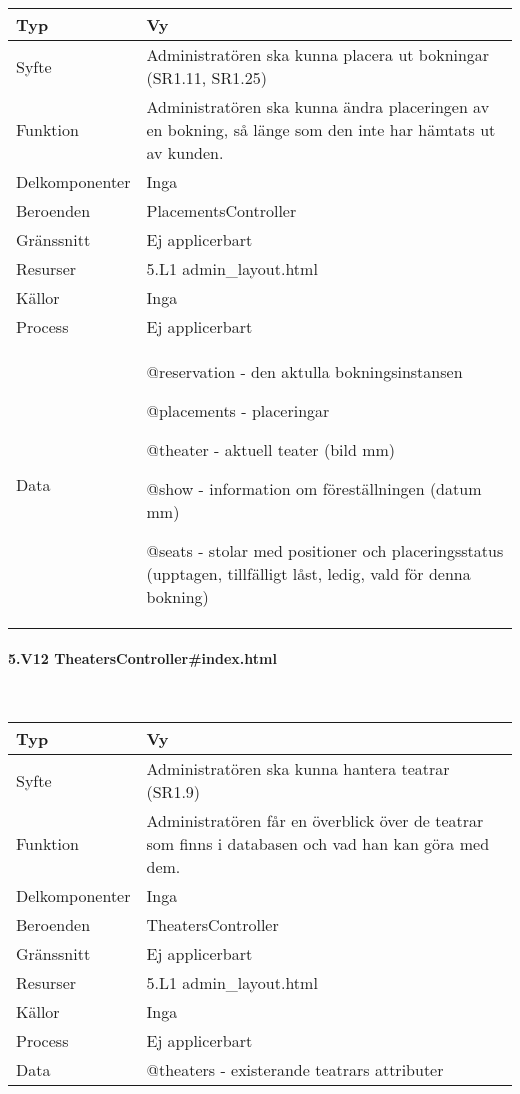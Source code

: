 \documentclass[a4paper, twoside, 11pt, titlepage]{article}
\begin{document}
			\begin {table} [ht] \begin{tabular} {  p{3.5cm} p{9.6cm} }
				\hline
				{Typ} & {Vy} \\
				\hline
				{Syfte} & {Administratören ska kunna placera ut bokningar (SR1.11, SR1.25)} \\
				\hline
				{Funktion} & {Administratören ska kunna ändra placeringen av en bokning, så länge som den inte har hämtats ut av kunden.} \\
				\hline
				{Delkomponenter} & {Inga} \\
				\hline
				{Beroenden} & {PlacementsController} \\
				\hline
				{Gränssnitt} & {Ej applicerbart} \\
				\hline
				{Resurser} & {5.L1 admin\_layout.html} \\
				\hline
				{Källor} & {Inga} \\
				\hline
				{Process} & {Ej applicerbart} \\
				\hline
				{Data} & {@reservation - den aktulla bokningsinstansen

@placements - placeringar

@theater - aktuell teater (bild mm)

@show - information om föreställningen (datum mm)

@seats - stolar med positioner och placeringsstatus (upptagen, tillfälligt låst, ledig, vald för denna bokning)} \\
				\hline
			\end{tabular} \end{table} \FloatBarrier


			\paragraph{5.V12 TheatersController\#index.html}\

			\begin {table} [ht] \begin{tabular} {  p{3.5cm} p{9.6cm} }
				\hline
				{Typ} & {Vy} \\
				\hline
				{Syfte} & {Administratören ska kunna hantera teatrar (SR1.9)} \\
				\hline
				{Funktion} & {Administratören får en överblick över de teatrar som finns i databasen och vad han kan göra med dem.} \\
				\hline
				{Delkomponenter} & {Inga} \\
				\hline
				{Beroenden} & {TheatersController} \\
				\hline
				{Gränssnitt} & {Ej applicerbart} \\
				\hline
				{Resurser} & {5.L1 admin\_layout.html} \\
				\hline
				{Källor} & {Inga} \\
				\hline
				{Process} & {Ej applicerbart} \\
				\hline
				{Data} & {@theaters - existerande teatrars attributer } \\
				\hline
			\end{tabular} \end{table} \FloatBarrier
\end{document}
